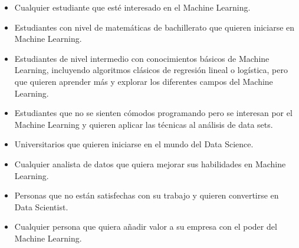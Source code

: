 \documentclass[]{article}
\providecommand{\tightlist}{%
  \setlength{\itemsep}{0pt}\setlength{\parskip}{0pt}}
\begin{document}
\begin{itemize}
\tightlist
\item
  Cualquier estudiante que esté interesado en el Machine Learning.
\item
  Estudiantes con nivel de matemáticas de bachillerato que quieren
  iniciarse en Machine Learning.
\item
  Estudiantes de nivel intermedio con conocimientos básicos de Machine
  Learning, incluyendo algoritmos clásicos de regresión lineal o
  logística, pero que quieren aprender más y explorar los diferentes
  campos del Machine Learning.
\item
  Estudiantes que no se sienten cómodos programando pero se interesan
  por el Machine Learning y quieren aplicar las técnicas al análisis de
  data sets.
\item
  Universitarios que quieren iniciarse en el mundo del Data Science.
\item
  Cualquier analista de datos que quiera mejorar sus habilidades en
  Machine Learning.
\item
  Personas que no están satisfechas con su trabajo y quieren convertirse
  en Data Scientist.
\item
  Cualquier persona que quiera añadir valor a su empresa con el poder
  del Machine Learning.
\end{itemize}
\end{document}
